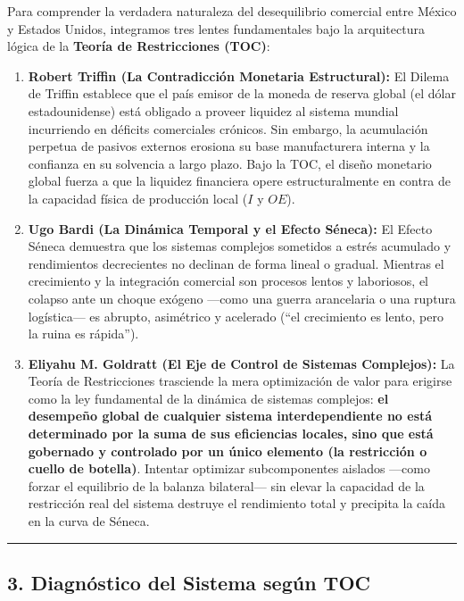 \documentclass[12pt,letterpaper]{article}
\begin{document}
Para comprender la verdadera naturaleza del desequilibrio comercial
entre México y Estados Unidos, integramos tres lentes fundamentales bajo
la arquitectura lógica de la \textbf{Teoría de Restricciones (TOC)}:

\begin{enumerate}
\def\labelenumi{\arabic{enumi}.}
\item
  \textbf{Robert Triffin (La Contradicción Monetaria Estructural):} El
  Dilema de Triffin establece que el país emisor de la moneda de reserva
  global (el dólar estadounidense) está obligado a proveer liquidez al
  sistema mundial incurriendo en déficits comerciales crónicos. Sin
  embargo, la acumulación perpetua de pasivos externos erosiona su base
  manufacturera interna y la confianza en su solvencia a largo plazo.
  Bajo la TOC, el diseño monetario global fuerza a que la liquidez
  financiera opere estructuralmente en contra de la capacidad física de
  producción local (\(I\) y \(OE\)).
\item
  \textbf{Ugo Bardi (La Dinámica Temporal y el Efecto Séneca):} El
  Efecto Séneca demuestra que los sistemas complejos sometidos a estrés
  acumulado y rendimientos decrecientes no declinan de forma lineal o
  gradual. Mientras el crecimiento y la integración comercial son
  procesos lentos y laboriosos, el colapso ante un choque exógeno
  ---como una guerra arancelaria o una ruptura logística--- es abrupto,
  asimétrico y acelerado (``el crecimiento es lento, pero la ruina es
  rápida'').
\item
  \textbf{Eliyahu M. Goldratt (El Eje de Control de Sistemas
  Complejos):} La Teoría de Restricciones trasciende la mera
  optimización de valor para erigirse como la ley fundamental de la
  dinámica de sistemas complejos: \textbf{el desempeño global de
  cualquier sistema interdependiente no está determinado por la suma de
  sus eficiencias locales, sino que está gobernado y controlado por un
  único elemento (la restricción o cuello de botella)}. Intentar
  optimizar subcomponentes aislados ---como forzar el equilibrio de la
  balanza bilateral--- sin elevar la capacidad de la restricción real
  del sistema destruye el rendimiento total y precipita la caída en la
  curva de Séneca.
\end{enumerate}

\begin{center}\rule{0.5\linewidth}{0.5pt}\end{center}

\hypertarget{diagnuxf3stico-del-sistema-seguxfan-toc}{%
\subsection{3. Diagnóstico del Sistema según
TOC}\label{diagnuxf3stico-del-sistema-seguxfan-toc}}
\end{document}

